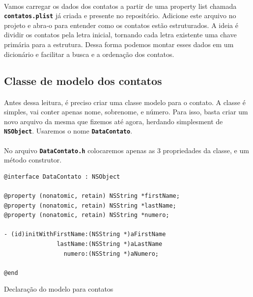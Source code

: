 \documentclass[a4paper,12pt,brazil,doubleside]{book}
\begin{document}
\begin{singlespace}
\paragraph{}Vamos carregar os dados dos contatos a partir de uma property list chamada \texttt{\textbf{contatos.plist}} já criada e presente no repositório. Adicione este arquivo no projeto e abra-o para entender como os contatos estão estruturados. A ideia é dividir os contatos pela letra inicial, tornando cada letra existente uma chave primária para a estrutura. Dessa forma podemos montar esses dados em um dicionário e facilitar a busca e a ordenação dos contatos.

\bigskip

\subsection{Classe de modelo dos contatos}

\paragraph{}Antes dessa leitura, é preciso criar uma classe modelo para o contato. A classe é simples, vai conter apenas nome, sobrenome, e número. Para isso, basta criar um novo arquivo da mesma que fizemos até agora, herdando simplesment de \texttt{\textbf{NSObject}}. Usaremos o nome \texttt{\textbf{DataContato}}.
\paragraph{}No arquivo \texttt{\textbf{DataContato.h}} colocaremos apenas as 3 propriedades da classe, e um método construtor.

\begin{listing}[H]
\begin{verbatim}
@interface DataContato : NSObject

@property (nonatomic, retain) NSString *firstName;
@property (nonatomic, retain) NSString *lastName;
@property (nonatomic, retain) NSString *numero;

- (id)initWithFirstName:(NSString *)aFirstName
               lastName:(NSString *)aLastName
                 numero:(NSString *)aNumero;

@end
\end{verbatim}
\caption{Declaração do modelo para contatos}
\end{listing}


\end{singlespace}
\end{document}

